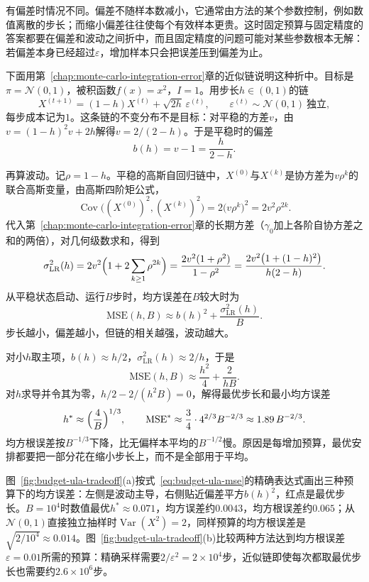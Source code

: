 有偏差时情况不同。偏差不随样本数减小，它通常由方法的某个参数控制，例如数值离散的步长；而缩小偏差往往使每个有效样本更贵。这时固定预算与固定精度的答案都要在偏差和波动之间折中，而且固定精度的问题可能对某些参数根本无解：若偏差本身已经超过$\varepsilon$，增加样本只会把误差压到偏差为止。

下面用第~\ref{chap:monte-carlo-integration-error}章的近似链说明这种折中。目标是$\pi=\mathcal{N}(0,1)$，被积函数$f(x)=x^{2}$，$I=1$。用步长$h\in(0,1)$的链
\begin{equation}
  X^{(t+1)}=(1-h)X^{(t)}+\sqrt{2h}\,\varepsilon^{(t)},\qquad\varepsilon^{(t)}\sim\mathcal{N}(0,1)\ \text{独立},
  \label{eq:budget-ula-chain}
\end{equation}
每步成本记为$1$。这条链的不变分布不是目标：对平稳的方差$v$，由$v=(1-h)^{2}v+2h$解得$v=2/(2-h)$。于是平稳时的偏差
\[
  b(h)=v-1=\frac{h}{2-h}.
\]

再算波动。记$\rho=1-h$。平稳的高斯自回归链中，$X^{(0)}$与$X^{(k)}$是协方差为$v\rho^{k}$的联合高斯变量，由高斯四阶矩公式，
\[
  \operatorname{Cov}\bigl((X^{(0)})^{2},(X^{(k)})^{2}\bigr)=2\bigl(v\rho^{k}\bigr)^{2}=2v^{2}\rho^{2k}.
\]
代入第~\ref{chap:monte-carlo-integration-error}章的长期方差（$\gamma_{0}$加上各阶自协方差之和的两倍），对几何级数求和，得到
\[
  \sigma_{\mathrm{LR}}^{2}(h)=2v^{2}\Bigl(1+2\sum_{k\ge1}\rho^{2k}\Bigr)=\frac{2v^{2}(1+\rho^{2})}{1-\rho^{2}}=\frac{2v^{2}\bigl(1+(1-h)^{2}\bigr)}{h(2-h)} .
\]
从平稳状态启动、运行$B$步时，均方误差在$B$较大时为
\begin{equation}
  \mathrm{MSE}(h,B)\approx b(h)^{2}+\frac{\sigma_{\mathrm{LR}}^{2}(h)}{B} .
  \label{eq:budget-ula-mse}
\end{equation}
步长越小，偏差越小，但链的相关越强，波动越大。

对小$h$取主项，$b(h)\approx h/2$，$\sigma_{\mathrm{LR}}^{2}(h)\approx2/h$，于是
\[
  \mathrm{MSE}(h,B)\approx\frac{h^{2}}{4}+\frac{2}{hB}.
\]
对$h$求导并令其为零，$h/2-2/(h^{2}B)=0$，解得最优步长和最小均方误差
\begin{equation}
  h^{\ast}\approx\Bigl(\frac{4}{B}\Bigr)^{1/3},\qquad\mathrm{MSE}^{\ast}\approx\frac34\cdot4^{2/3}B^{-2/3}\approx1.89\,B^{-2/3}.
  \label{eq:budget-ula-opt}
\end{equation}
均方根误差按$B^{-1/3}$下降，比无偏样本平均的$B^{-1/2}$慢。原因是每增加预算，最优安排都要把一部分花在缩小步长上，而不是全部用于平均。

图~\ref{fig:budget-ula-tradeoff}(a)按式~\eqref{eq:budget-ula-mse}的精确表达式画出三种预算下的均方误差：左侧是波动主导，右侧贴近偏差平方$b(h)^{2}$，红点是最优步长。$B=10^{4}$时数值最优$h^{\ast}\approx0.071$，均方误差约$0.0043$，均方根误差约$0.065$；从$\mathcal{N}(0,1)$直接独立抽样时$\operatorname{Var}(X^{2})=2$，同样预算的均方根误差是$\sqrt{2/10^{4}}\approx0.014$。图~\ref{fig:budget-ula-tradeoff}(b)比较两种方法达到均方根误差$\varepsilon=0.01$所需的预算：精确采样需要$2/\varepsilon^{2}=2\times10^{4}$步，近似链即使每次都取最优步长也需要约$2.6\times10^{6}$步。

